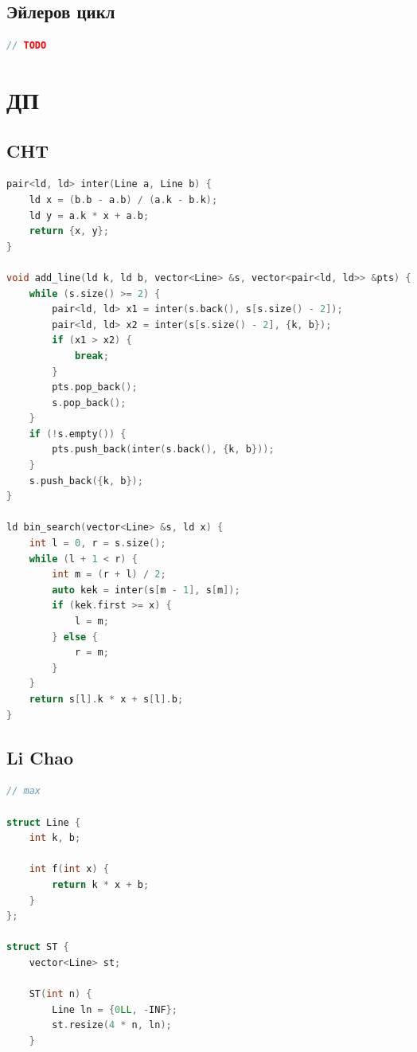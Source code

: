 \documentclass[10pt,a4paper,landscape,twosided]{extarticle}
\begin{document}
\begin{multicols}{3}
\begin{lstlisting}[language=C++]
\end{lstlisting}

\subsection{Эйлеров цикл}
\begin{lstlisting}[language=C++]
// TODO

\end{lstlisting}

\section{ДП}

\subsection{CHT}
\begin{lstlisting}[language=C++]
pair<ld, ld> inter(Line a, Line b) {
    ld x = (b.b - a.b) / (a.k - b.k);
    ld y = a.k * x + a.b;
    return {x, y};
}
 
void add_line(ld k, ld b, vector<Line> &s, vector<pair<ld, ld>> &pts) {
    while (s.size() >= 2) {
        pair<ld, ld> x1 = inter(s.back(), s[s.size() - 2]);
        pair<ld, ld> x2 = inter(s[s.size() - 2], {k, b});
        if (x1 > x2) {
            break;
        }
        pts.pop_back();
        s.pop_back();
    }
    if (!s.empty()) {
        pts.push_back(inter(s.back(), {k, b}));
    }
    s.push_back({k, b});
}
 
ld bin_search(vector<Line> &s, ld x) {
    int l = 0, r = s.size();
    while (l + 1 < r) {
        int m = (r + l) / 2;
        auto kek = inter(s[m - 1], s[m]);
        if (kek.first >= x) {
            l = m;
        } else {
            r = m;
        }
    }
    return s[l].k * x + s[l].b;
}

\end{lstlisting}

\subsection{Li Chao}
\begin{lstlisting}[language=C++]
// max

struct Line {
    int k, b;

    int f(int x) {
        return k * x + b;
    }
};

struct ST {
    vector<Line> st;

    ST(int n) {
        Line ln = {0LL, -INF};
        st.resize(4 * n, ln);
    }


\end{lstlisting}
\end{multicols}
\end{document}
